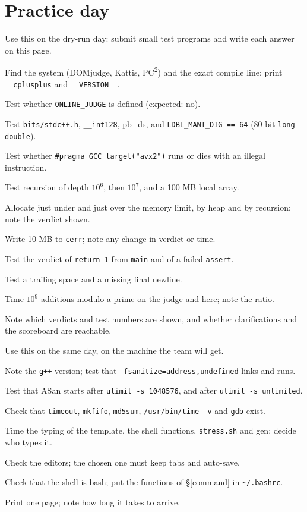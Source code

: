 \section*{Practice day}
\thispagestyle{practice}
{\footnotesize\tightdisplay
{}
Use this on the dry-run day: submit small test programs and write each answer on this page.
\begin{checks}
	\item Find the system (DOMjudge, Kattis, PC\textsuperscript{2}) and the exact compile line; print \texttt{\_\_cplusplus} and \texttt{\_\_VERSION\_\_}.
	\item Test whether \texttt{ONLINE\_JUDGE} is defined (expected: no).
	\item Test \texttt{bits/stdc++.h}, \texttt{\_\_int128}, pb\_ds, and \texttt{LDBL\_MANT\_DIG == 64} (80-bit \texttt{long double}).
	\item Test whether \texttt{\#pragma GCC target("avx2")} runs or dies with an illegal instruction.
	\item Test recursion of depth $10^6$, then $10^7$, and a 100 MB local array.
	\item Allocate just under and just over the memory limit, by heap and by recursion; note the verdict shown.
	\item Write 10 MB to \texttt{cerr}; note any change in verdict or time.
	\item Test the verdict of \texttt{return 1} from \texttt{main} and of a failed \texttt{assert}.
	\item Test a trailing space and a missing final newline.
	\item Time $10^9$ additions modulo a prime on the judge and here; note the ratio.
	\item Note which verdicts and test numbers are shown, and whether clarifications and the scoreboard are reachable.
\end{checks}
Use this on the same day, on the machine the team will get.
\begin{checks}
	\item Note the \texttt{g++} version; test that \texttt{-fsanitize=address,undefined} links and runs.
	\item Test that ASan starts after \texttt{ulimit -s 1048576}, and after \texttt{ulimit -s unlimited}.
	\item Check that \texttt{timeout}, \texttt{mkfifo}, \texttt{md5sum}, \texttt{/usr/bin/time -v} and \texttt{gdb} exist.
	\item Time the typing of the template, the shell functions, \texttt{stress.sh} and gen; decide who types it.
	\item Check the editors; the chosen one must keep tabs and auto-save.
	\item Check that the shell is bash; put the functions of \S\ref{command} in \texttt{\textasciitilde/.bashrc}.
	\item Print one page; note how long it takes to arrive.
\end{checks}
}
